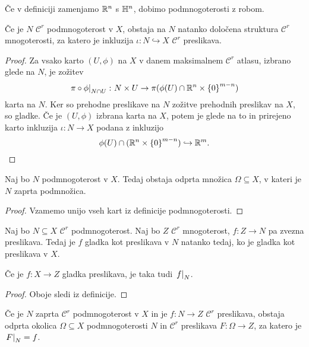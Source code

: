 \begin{opomba}
Če v definiciji zamenjamo $\mathbb{R}^n$ s $\mathbb{H}^n$, dobimo podmnogoterosti
z robom.
\end{opomba}

\begin{trditev}
Če je $N$ $\mathcal{C}^r$ podmnogoterost v $X$, obstaja na $N$
natanko določena struktura $\mathcal{C}^r$ mnogoterosti, za katero
je inkluzija $\iota \colon N \hookrightarrow X$ $\mathcal{C}^r$
preslikava.
\end{trditev}

\begin{proof}
Za vsako karto $(U, \phi)$ na $X$ v danem maksimalnem
$\mathcal{C}^r$ atlasu, izbrano glede na $N$, je zožitev
\[
\left. \pi \circ \phi\right|_{N \cap U}^{} \colon N \times U \to
\pi(\phi(U) \cap \mathbb{R}^n \times \left\{0\right\}^{m-n})
\]
karta na $N$. Ker so prehodne preslikave na $N$ zožitve prehodnih
preslikav na $X$, so gladke. Če je $(U, \phi)$ izbrana karta na
$X$, potem je glede na to in prirejeno karto inkluzija
$\iota \colon N \to X$ podana z inkluzijo
\[
\phi(U) \cap (\mathbb{R}^n \times \left\{0\right\}^{m-n}) \hookrightarrow \mathbb{R}^m.
\qedhere
\]
\end{proof}


\begin{trditev}
Naj bo $N$ podmnogoterost v $X$. Tedaj obstaja odprta množica
$\Omega \subseteq X$, v kateri je $N$ zaprta podmnožica.
\end{trditev}

\begin{proof}
Vzamemo unijo vseh kart iz definicije podmnogoterosti.
\end{proof}

\begin{trditev}
Naj bo $N \subseteq X$ $\mathcal{C}^r$ podmnogoterost. Naj bo $Z$
$\mathcal{C}^r$ mnogoterost, $f \colon Z \to N$ pa zvezna
preslikava. Tedaj je $f$ gladka kot preslikava v $N$ natanko tedaj,
ko je gladka kot preslikava v $X$.

Če je $f \colon X \to Z$ gladka preslikava, je taka tudi
$\left. f\right|_{N}^{}$.
\end{trditev}

\begin{proof}
Oboje sledi iz definicije.
\end{proof}

\begin{izrek}
Če je $N$ zaprta $\mathcal{C}^r$ podmnogoterost v $X$ in je
$f \colon N \to Z$ $\mathcal{C}^r$ preslikava, obstaja odprta
okolica $\Omega \subseteq X$ podmnogoterosti $N$ in $\mathcal{C}^r$
preslikava $F \colon \Omega \to Z$, za katero je $\left. F\right|_{N}^{}=f$.
\end{izrek}


